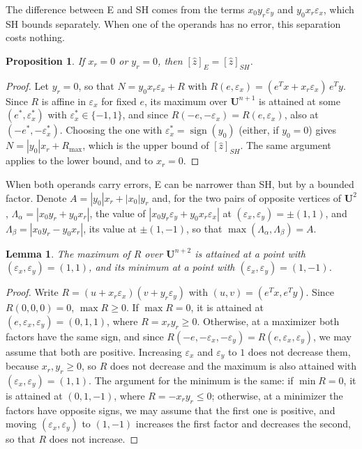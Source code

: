 \documentclass[10pt]{article}
\newtheorem{propo}{Proposition}
\newtheorem{lemma}{Lemma}
\theoremstyle{definition}
\newcommand{\U}{\mathbf{U}}
\newcommand{\eps}{\varepsilon}
\newcommand{\ex}{\eps_x}
\newcommand{\ey}{\eps_y}
\begin{document}
The difference between E and SH comes from the terms $x_0y_r\ey$ and $y_0x_r\ex$, which SH bounds separately. When one of the operands has no error, this separation costs nothing.

\begin{propo}
\label{prop:oneerror}
If $x_r=0$ or $y_r=0$, then $[\hat z]_E=[\hat z]_{SH}$.
\end{propo}
\begin{proof}
Let $y_r=0$, so that $N = y_0x_r\ex + R$ with $R(e,\ex)=(e^Tx+x_r\ex)\,e^Ty$. Since $R$ is affine in $\ex$ for fixed $e$, its maximum over $\U^{n+1}$ is attained at some $(e^*,\ex^*)$ with $\ex^*\in\{-1,1\}$, and since $R(-e,-\ex)=R(e,\ex)$, also at $(-e^*,-\ex^*)$. Choosing the one with $\ex^*=\operatorname{sign}(y_0)$ (either, if $y_0=0$) gives $N = |y_0|x_r + R_{\max}$, which is the upper bound of $[\hat z]_{SH}$. The same argument applies to the lower bound, and to $x_r=0$.
\end{proof}

When both operands carry errors, E can be narrower than SH, but by a bounded factor. Denote $A=|y_0|x_r+|x_0|y_r$ and, for the two pairs of opposite vertices of $\U^2$, $\Lambda_\alpha=|x_0y_r+y_0x_r|$, the value of $|x_0y_r\ey+y_0x_r\ex|$ at $(\ex,\ey)=\pm(1,1)$, and $\Lambda_\beta=|x_0y_r-y_0x_r|$, its value at $\pm(1,-1)$, so that $\max(\Lambda_\alpha,\Lambda_\beta)=A$.

\begin{lemma}
\label{lem:classes}
The maximum of $R$ over $\U^{n+2}$ is attained at a point with $(\ex,\ey)=(1,1)$, and its minimum at a point with $(\ex,\ey)=(1,-1)$.
\end{lemma}
\begin{proof}
Write $R=(u+x_r\ex)(v+y_r\ey)$ with $(u,v)=(e^Tx,e^Ty)$. Since $R(0,0,0)=0$, $\max R\ge0$. If $\max R=0$, it is attained at $(e,\ex,\ey)=(0,1,1)$, where $R=x_ry_r\ge0$. Otherwise, at a maximizer both factors have the same sign, and since $R(-e,-\ex,-\ey)=R(e,\ex,\ey)$, we may assume that both are positive. Increasing $\ex$ and $\ey$ to $1$ does not decrease them, because $x_r,y_r\ge0$, so $R$ does not decrease and the maximum is also attained with $(\ex,\ey)=(1,1)$. The argument for the minimum is the same: if $\min R=0$, it is attained at $(0,1,-1)$, where $R=-x_ry_r\le0$; otherwise, at a minimizer the factors have opposite signs, we may assume that the first one is positive, and moving $(\ex,\ey)$ to $(1,-1)$ increases the first factor and decreases the second, so that $R$ does not increase.
\end{proof}
\end{document}
